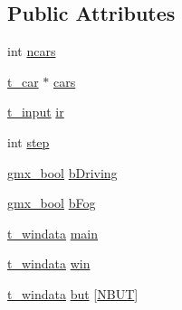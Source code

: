 \subsection*{\-Public \-Attributes}
\begin{DoxyCompactItemize}
\item 
int \hyperlink{structt__xhighway_af59bb77cb0c8b569f9ea2d1e16bb5e37}{ncars}
\item 
\hyperlink{structt__car}{t\-\_\-car} $\ast$ \hyperlink{structt__xhighway_a7fece9aba1680c11cd8e8307ec217017}{cars}
\item 
\hyperlink{structt__input}{t\-\_\-input} \hyperlink{structt__xhighway_ad79cb52e80acaec9f25169b46610e238}{ir}
\item 
int \hyperlink{structt__xhighway_a2f80467b2cd4e82a936281f5f10ec9e4}{step}
\item 
\hyperlink{include_2types_2simple_8h_a8fddad319f226e856400d190198d5151}{gmx\-\_\-bool} \hyperlink{structt__xhighway_ae56749819464e36a8cc14e058c16d2a5}{b\-Driving}
\item 
\hyperlink{include_2types_2simple_8h_a8fddad319f226e856400d190198d5151}{gmx\-\_\-bool} \hyperlink{structt__xhighway_adfb032a0d0f1884d9d2038304a9f44aa}{b\-Fog}
\item 
\hyperlink{structt__windata}{t\-\_\-windata} \hyperlink{structt__xhighway_a4a0a527e870b4e166162b1bfb2909f2f}{main}
\item 
\hyperlink{structt__windata}{t\-\_\-windata} \hyperlink{structt__xhighway_a0edd01f5c5bfae8decd82a7275084ff4}{win}
\item 
\hyperlink{structt__windata}{t\-\_\-windata} \hyperlink{structt__xhighway_a2089ec09b9068e576b5377eedf424157}{but} \mbox{[}\hyperlink{g__highway_8c_a3e08a16703943b810da7b8b2a915c836a1566ba58adb7ebe15f706d8bd670f10d}{\-N\-B\-U\-T}\mbox{]}
\end{DoxyCompactItemize}


